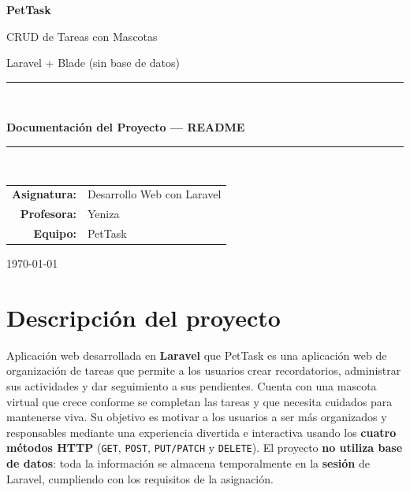 \documentclass[11pt,a4paper]{article}
\begin{document}
\begin{titlepage}
    \centering
    \vspace*{3cm}
    {\Huge\bfseries\color{primary} PetTask\par}
    \vspace{0.5cm}
    {\Large CRUD de Tareas con Mascotas\par}
    \vspace{0.3cm}
    {\large Laravel + Blade (sin base de datos)\par}
    \vspace{2cm}
    \rule{\linewidth}{0.5pt}\\[0.4cm]
    {\large\textbf{Documentación del Proyecto --- README}\par}
    \rule{\linewidth}{0.5pt}\\[2cm]

    \begin{tabular}{rl}
        \textbf{Asignatura:} & Desarrollo Web con Laravel \\
        \textbf{Profesora:}  & Yeniza \\
        \textbf{Equipo:}     & PetTask \\
    \end{tabular}

    \vfill
    {\large \today\par}
\end{titlepage}

\tableofcontents
\newpage

\section{Descripción del proyecto}

Aplicación web desarrollada en \textbf{Laravel} que PetTask es una aplicación web de organización de tareas que permite a los usuarios crear recordatorios, administrar sus actividades y dar seguimiento a sus pendientes. Cuenta con una mascota virtual que crece conforme se completan las tareas y que necesita cuidados para mantenerse viva. Su objetivo es motivar a los usuarios a ser más organizados y responsables mediante una experiencia divertida e interactiva usando los \textbf{cuatro métodos HTTP} (\texttt{GET}, \texttt{POST}, \texttt{PUT/PATCH} y \texttt{DELETE}). El proyecto \textbf{no utiliza base de datos}: toda la información se almacena temporalmente en la \textbf{sesión} de Laravel, cumpliendo con los requisitos de la asignación.
\end{document}
